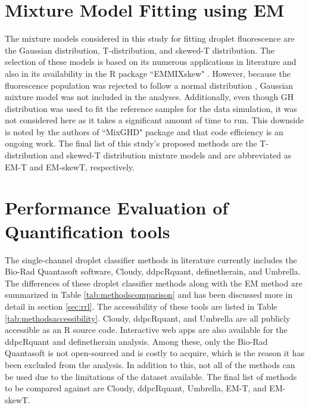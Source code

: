 \section{Mixture Model Fitting using EM}
\label{sec:modelfitting}

The mixture models considered in this study for fitting droplet fluorescence are the Gaussian distribution, T-distribution, and skewed-T distribution. The selection of these models is based on its numerous applications in literature and also in its availability in the R package ``EMMIXskew" \cite{ref:EMMIXSkew}. However, because the fluorescence population was rejected to follow a normal distribution \cite{ref:Trypsteen2015, ref:Jacobs2017}, Gaussian mixture model was not included in the analyses. Additionally, even though GH distribution was used to fit the reference samples for the data simulation, it was not considered here as it takes a significant amount of time to run. This downside is noted by the authors of ``MixGHD" package and that code efficiency is an ongoing work. The final list of this study's proposed methods are the T-distribution and skewed-T distribution mixture models and are abbreviated as EM-T and EM-skewT, respectively.

\section{Performance Evaluation of Quantification tools}
\label{sec:performanceeval}

The single-channel droplet classifier methods in literature currently includes the Bio-Rad Quantasoft software, Cloudy, ddpcRquant, definetherain, and Umbrella. The differences of these droplet classifier methods along with the EM method are summarized in Table \ref{tab:methodscomparison} and has been discussed more in detail in section \ref{sec:rrl}. The accessibility of these tools are listed in Table \ref{tab:methodsaccessibility}. Cloudy, ddpcRquant, and Umbrella are all publicly accessible as an R source code. Interactive web apps are also available for the ddpcRquant and definetherain analysis. Among these, only the Bio-Rad Quantasoft is not open-sourced and is costly to acquire, which is the reason it has been excluded from the analysis. In addition to this, not all of the methods can be used due to the limitations of the dataset available. The final list of methods to be compared against are Cloudy, ddpcRquant, Umbrella, EM-T, and EM-skewT. 

